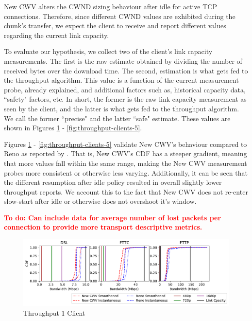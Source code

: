 \documentclass[10pt,sigconf]{acmart}
\newcommand{\todo}[1]{\textbf{\textcolor{red}{To do: #1}}}
\begin{document}
New CWV alters the CWND sizing behaviour after idle for active TCP connections. Therefore, since different CWND values are exhibited during the chunk's transfer, we expect the client to receive and report different values regarding the current link capacity. 

To evaluate our hypothesis, we collect two of the client's link capacity measurements. The first is the raw estimate obtained by dividing the number of received bytes over the download time. The second, estimation is what gets fed to the throughput algorithm. This value is a function of the current measurement probe, already explained, and additional factors such as, historical capacity data, ``safety" factors, etc. In short, the former is the raw link capacity measurement as seen by the client, and the latter is what gets fed to the throughput algorithm. We call the former ``precise" and the latter ``safe" estimate. These values are shown in Figures \ref{fig:throughput-clients-1} - \ref{fig:throughput-clients-5}.

Figures \ref{fig:throughput-clients-1} - \ref{fig:throughput-clients-5} validate New CWV's behaviour compared to Reno as reported by \cite{Nazir-2014-performance-evaluation-congestion-window-validation-dash-newcwv}. That is, New CWV's CDF has a steeper gradient, meaning that more values fall within the same range, making the New CWV measurement probes more consistent or otherwise less varying. Additionally, it can be seen that the different resumption after idle policy resulted in overall slightly lower throughput reports. We account this to the fact that New CWV does not re-enter slow-start after idle or otherwise does not overshoot it's window. 


\todo{Can include data for average number of lost packets per connection to provide more transport descriptive metrics.}

\begin{figure}
  \centering
  \includegraphics[width=\textwidth]{figures/Throughput_1_clients.pdf}
  \caption{Throughput 1 Client}
  \label{fig:throughput-clients-1}
\end{figure}
\end{document}
